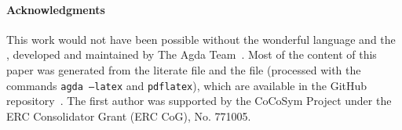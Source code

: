 \paragraph*{Acknowledgments}
This work would not have been possible without the wonderful \agda language and the
\agdastdlib, developed and
maintained by The Agda Team~\cite{agdastdlib}.
Most of the content of this paper was generated from the literate \agda file \HSPlagda and the \LaTeXe file \agdahsp (processed with the commands
\texttt{agda --latex} and \texttt{pdflatex}), which are available in the \agdaalgebras GitHub repository~\cite{ualib_v2.0.0}.
The first author was supported by the CoCoSym Project under the ERC Consolidator Grant (ERC CoG), No. 771005.




